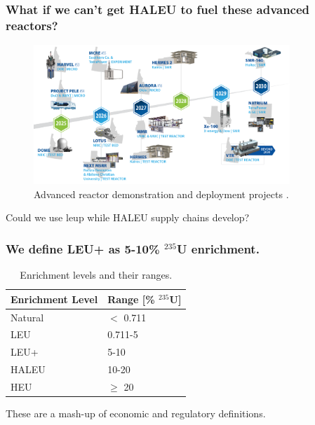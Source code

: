 \documentclass[9pt]{beamer}
\begin{document}
  \begin{frame}
    \frametitle{What if we can't get HALEU to fuel these advanced reactors?}
    \begin{figure}
        \centering
        \includegraphics[width=0.86\textwidth]{images/reactor_timeline.png}
        \caption{Advanced reactor demonstration and deployment projects \cite{inl_reactor_timeline}.}
    \end{figure}
    Could we use \gls{leup} while HALEU supply chains develop?
  \end{frame}

  \begin{frame}
    \frametitle{We define LEU+ as 5-10\% $^{235}$U enrichment.}
    \begin{table}[H]
        \centering
        \caption{Enrichment levels and their ranges.}
        \label{tab:enrichment_levels}
        \begin{tabular}{l l}
          \hline
          \textbf{Enrichment Level} & \textbf{Range [\%  $^{235}$U]} \\
          \hline
          Natural & $<$ 0.711 \\
          LEU & 0.711-5 \\
          LEU+ & 5-10 \\
          HALEU & 10-20 \\
          HEU & $\geq$ 20  \\
          \hline
        \end{tabular}
    \end{table}
    \vspace{8pt}
    These are a mash-up of economic and regulatory definitions.
  \end{frame}
\end{document}
